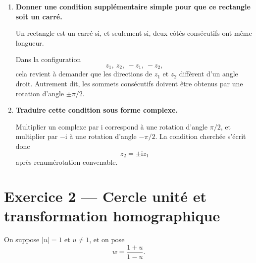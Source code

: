 \documentclass[11pt,a4paper]{article}
\newcommand{\ii}{\mathrm{i}}
\begin{document}
\begin{enumerate}[label=\textbf{D2.\arabic*.}]
Les diagonales \([z_1z_3]\) et \([z_2z_4]\) ont donc le même milieu, à savoir l’origine. Le quadrilatère formé est donc un parallélogramme centré en \(0\).

De plus, ses quatre sommets appartiennent tous à un même cercle, celui de centre \(0\) et de rayon \(r\). Or un parallélogramme inscrit dans un cercle est un rectangle.

On conclut donc qu’après renumérotation éventuelle, les points d’affixes \(z_1,z_2,z_3,z_4\) sont les sommets d’un rectangle centré en \(0\).

    \item \textbf{Donner une condition supplémentaire simple pour que ce rectangle soit un carré.}

    Un rectangle est un carré si, et seulement si, deux côtés consécutifs ont même longueur.

    Dans la configuration
    \[
    z_1,\ z_2,\ -z_1,\ -z_2,
    \]
    cela revient à demander que les directions de \(z_1\) et \(z_2\) diffèrent d’un angle droit. Autrement dit, les sommets consécutifs doivent être obtenus par une rotation d’angle \(\pm\pi/2\).

    \item \textbf{Traduire cette condition sous forme complexe.}

    Multiplier un complexe par \(\ii\) correspond à une rotation d’angle \(\pi/2\), et multiplier par \(-\ii\) à une rotation d’angle \(-\pi/2\). La condition cherchée s’écrit donc
    \[
    \boxed{z_2=\pm \ii z_1}
    \]
    après renumérotation convenable.

\end{enumerate}

\newpage

\section*{Exercice 2 --- Cercle unité et transformation homographique}

On suppose \(|u|=1\) et \(u\neq 1\), et on pose
\[
w=\frac{1+u}{1-u}.
\]
\end{document}

